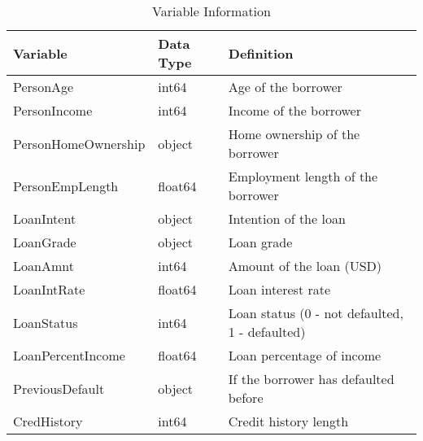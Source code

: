 \begin{table}[H]\centering
\caption{Variable Information}
\label{Table 1:variable_info}
\begin{tabular}{lll}
\toprule
Variable & Data Type & Definition \\
\midrule
PersonAge & int64 & Age of the borrower \\
PersonIncome & int64 & Income of the borrower \\
PersonHomeOwnership & object & Home ownership of the borrower \\
PersonEmpLength & float64 & Employment length of the borrower \\
LoanIntent & object & Intention of the loan \\
LoanGrade & object & Loan grade \\
LoanAmnt & int64 & Amount of the loan (USD) \\
LoanIntRate & float64 & Loan interest rate \\
LoanStatus & int64 & Loan status (0 - not defaulted, 1 - defaulted) \\
LoanPercentIncome & float64 & Loan percentage of income \\
PreviousDefault & object & If the borrower has defaulted before \\
CredHistory & int64 & Credit history length \\
\bottomrule
\end{tabular}
\end{table}
